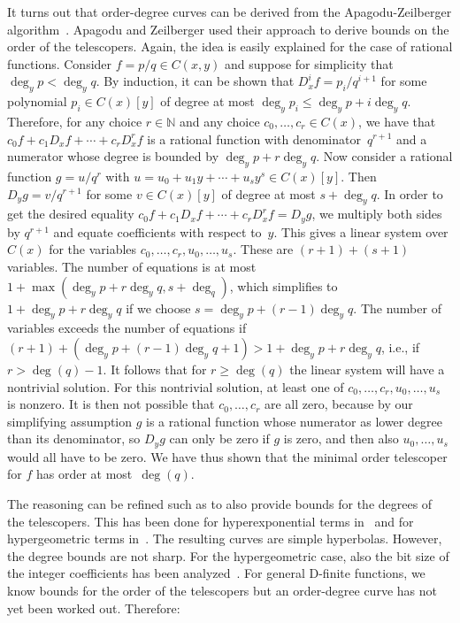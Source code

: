\documentclass{jssc}
\let\set\mathbb
\begin{document}
 It turns out that order-degree curves can be derived from the Apagodu-Zeilberger algorithm~\cite{mohammed05}.
 Apagodu and Zeilberger used their approach to derive bounds on the order of the telescopers. Again, the idea
 is easily explained for the case of rational functions. Consider $f=p/q\in C(x,y)$ and suppose for simplicity
 that $\deg_y p<\deg_y q$. By induction, it can be shown that $D_x^i f = p_i/q^{i+1}$ for some polynomial
 $p_i\in C(x)[y]$ of degree at most $\deg_y p_i\leq \deg_y p + i\deg_y q$. Therefore, for any choice $r\in\set N$
 and any choice $c_0,\dots,c_r\in C(x)$, we have that $c_0 f + c_1 D_x f + \cdots + c_r D_x^r f$ is a rational
 function with denominator~$q^{r+1}$ and a numerator whose degree is bounded by $\deg_y p+r\deg_y q$.
 Now consider a rational function $g=u/q^r$ with $u=u_0+u_1y+\cdots+u_sy^s\in C(x)[y]$.
 Then $D_y g=v/q^{r+1}$ for some $v\in C(x)[y]$ of degree at most $s + \deg_yq$.
 In order to get the desired equality $c_0 f + c_1 D_x f + \cdots + c_r D_x^r f=D_y g$, we multiply both
 sides by $q^{r+1}$ and equate coefficients with respect to~$y$.
 This gives a linear system over $C(x)$ for the variables $c_0,\dots,c_r,u_0,\dots,u_s$.
 These are $(r+1)+(s+1)$ variables.
 The number of equations is at most $1+\max(\deg_y p+r\deg_y q,s+\deg_q)$, which simplifies
 to $1+\deg_y p+r\deg_y q$ if we choose $s=\deg_y p+(r-1)\deg_y q$.
 The number of variables exceeds the number of equations if $(r+1)+(\deg_y p+(r-1)\deg_y q+1)>1+\deg_y p+r\deg_y q$,
 i.e., if $r>\deg(q)-1$.
 It follows that for $r\geq\deg(q)$ the linear system will have a nontrivial solution.
 For this nontrivial solution, at least one of $c_0,\dots,c_r,u_0,\dots,u_s$ is nonzero.
 It is then not possible that $c_0,\dots,c_r$ are all zero, because by our simplifying assumption $g$ is a rational
 function whose numerator as lower degree than its denominator, so $D_yg$ can only be zero if $g$ is zero, and then
 also $u_0,\dots,u_s$ would all have to be zero.
 We have thus shown that the minimal order telescoper for $f$ has order at most~$\deg(q)$.

 The reasoning can be refined such as to also provide bounds for the degrees of the telescopers. This has
 been done for hyperexponential terms in~\cite{chen12b} and for hypergeometric terms in~\cite{chen12c}. The resulting curves
 are simple hyperbolas. However, the degree bounds are not sharp. For the hypergeometric case, also the
 bit size of the integer coefficients has been analyzed~\cite{kauers14d}.
 For general D-finite functions, we know bounds for the order of the telescopers but an order-degree curve
 has not yet been worked out. Therefore:
\end{document}

